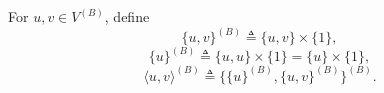 For $u, v \in V^{(B)}$, define
$$\{u, v\}^{(B)} \triangleq \{u, v\} \times \{1\},$$
$$\{u\}^{(B)} \triangleq \{u, u\} \times \{1\} = \{u\} \times \{1\},$$
$$\langle u, v \rangle^{(B)} \triangleq \{\{u\}^{(B)}, \{u, v\}^{(B)}\}^{(B)}.$$
